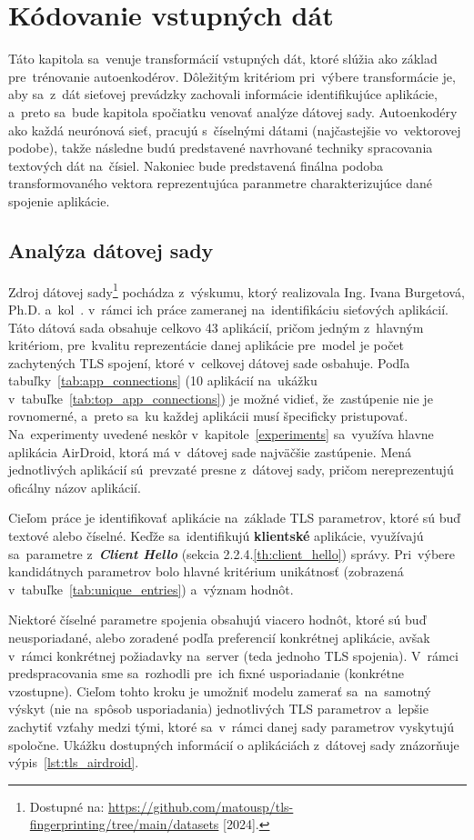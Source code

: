 \chapter{Kódovanie vstupných dát}\label{embedding}
Táto kapitola sa~venuje transformácií vstupných dát, ktoré slúžia ako základ pre~trénovanie autoenkodérov. Dôležitým kritériom pri~výbere transformácie je, aby sa~z~dát sieťovej prevádzky zachovali informácie identifikujúce aplikácie, a~preto sa~bude kapitola spočiatku venovať analýze dátovej sady.
Autoenkodéry ako každá neurónová sieť, pracujú s~číselnými dátami (najčastejšie vo~vektorovej podobe), takže následne budú predstavené navrhované techniky spracovania textových dát na~čísiel. Nakoniec bude predstavená finálna podoba transformovaného vektora reprezentujúca paranmetre charakterizujúce dané spojenie aplikácie.

\section{Analýza dátovej sady}
Zdroj {dátovej sady}\footnote{Dostupné na: \url{https://github.com/matousp/tls-fingerprinting/tree/main/datasets} [2024].} pochádza z~výskumu, ktorý realizovala Ing. Ivana Burgetová, Ph.D. a~kol~\cite{app_identification}. v~rámci ich práce zameranej na~identifikáciu sieťových aplikácií. Táto dátová sada obsahuje celkovo 43 aplikácií, pričom jedným z~hlavným kritériom, pre~kvalitu reprezentácie danej aplikácie pre~model je počet zachytených TLS spojení, ktoré v~celkovej dátovej sade osbahuje. Podľa tabuľky~\ref{tab:app_connections} (10 aplikácií na~ukážku v~tabuľke~\ref{tab:top_app_connections}) je možné vidieť, že~zastúpenie nie je rovnomerné, a~preto sa~ku každej aplikácii musí špecificky pristupovať. Na~experimenty uvedené neskôr v~kapitole~\ref{experiments} sa~využíva hlavne aplikácia AirDroid, ktorá má v~dátovej sade najväčšie zastúpenie. Mená jednotlivých aplikácií sú~prevzaté presne z~dátovej sady, pričom nereprezentujú oficálny názov aplikácií.

Cieľom práce je identifikovať aplikácie na~základe TLS parametrov, ktoré sú buď textové alebo číselné. Keďže sa~identifikujú \textbf{klientské} aplikácie, využívajú sa~parametre z~\textit{\textbf{Client Hello}} (sekcia 2.2.4.\ref{th:client_hello}) správy. Pri~výbere kandidátnych parametrov bolo hlavné kritérium unikátnosť (zobrazená v~tabuľke~\ref{tab:unique_entries}) a~význam hodnôt. 

\label{emb:ordering}
Niektoré číselné parametre spojenia obsahujú viacero hodnôt, ktoré sú buď neusporiadané, alebo zoradené podľa preferencií konkrétnej aplikácie, avšak v~rámci konkrétnej požiadavky na~server (teda jednoho TLS spojenia). V~rámci predspracovania sme sa~rozhodli pre~ich fixné usporiadanie (konkrétne vzostupne). Cieľom tohto kroku je umožniť modelu zamerať sa~na~samotný výskyt (nie na~spôsob usporiadania) jednotlivých TLS parametrov a~lepšie zachytiť vzťahy medzi tými, ktoré sa~v~rámci danej sady parametrov vyskytujú spoločne. Ukážku dostupných informácií o aplikáciách z~dátovej sady znázorňuje výpis~\ref{lst:tls_airdroid}.

